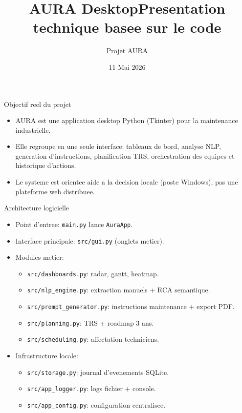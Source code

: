 \documentclass[10pt]{beamer}
\title{AURA Desktop\newline Presentation technique basee sur le code}
\author{Projet AURA}
\date{11 Mai 2026}
\begin{document}
\begin{frame}
\titlepage
\end{frame}

\begin{frame}{Objectif reel du projet}
\begin{itemize}
\item AURA est une application desktop Python (Tkinter) pour la maintenance industrielle.
\item Elle regroupe en une seule interface: tableaux de bord, analyse NLP, generation d'instructions, planification TRS, orchestration des equipes et historique d'actions.
\item Le systeme est orientee aide a la decision locale (poste Windows), pas une plateforme web distribuee.
\end{itemize}
\end{frame}

\begin{frame}{Architecture logicielle}
\begin{itemize}
\item Point d'entree: \texttt{main.py} lance \texttt{AuraApp}.
\item Interface principale: \texttt{src/gui.py} (onglets metier).
\item Modules metier:
\begin{itemize}
\item \texttt{src/dashboards.py}: radar, gantt, heatmap.
\item \texttt{src/nlp\_engine.py}: extraction manuels + RCA semantique.
\item \texttt{src/prompt\_generator.py}: instructions maintenance + export PDF.
\item \texttt{src/planning.py}: TRS + roadmap 3 ans.
\item \texttt{src/scheduling.py}: affectation techniciens.
\end{itemize}
\item Infrastructure locale:
\begin{itemize}
\item \texttt{src/storage.py}: journal d'evenements SQLite.
\item \texttt{src/app\_logger.py}: logs fichier + console.
\item \texttt{src/app\_config.py}: configuration centralisee.
\end{itemize}
\end{itemize}
\end{frame}
\end{document}
